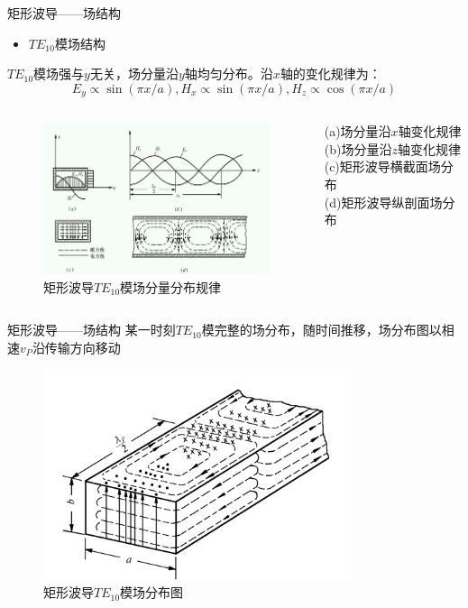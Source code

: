 \begin{frame}{矩形波导——场结构}
    \begin{itemize}
        \item $TE_{10}$模场结构
    \end{itemize}
    $TE_{10}$模场强与$y$无关，场分量沿$y$轴均匀分布。沿$x$轴的变化规律为：
    $$E_y \propto \sin(\pi x/a),H_x \propto \sin(\pi x/a),H_z \propto \cos(\pi x/a)$$
    \begin{columns}
        \begin{column}{0.7\linewidth}
            \begin{figure}
                \includegraphics[width=7cm]{Cha6//fig6-4.png}
                \caption{\footnotesize{矩形波导$TE_{10}$模场分量分布规律}}
            \end{figure}
        \end{column}
        \begin{column}{0.3\linewidth}
            {\footnotesize (a)场分量沿$x$轴变化规律\\
                (b)场分量沿$z$轴变化规律\\
                (c)矩形波导横截面场分布\\
                (d)矩形波导纵剖面场分布}
        \end{column}
    \end{columns}
\end{frame}

\begin{frame}{矩形波导——场结构}
    某一时刻$TE_{10}$模完整的场分布，随时间推移，场分布图以相速$v_P$沿传输方向移动
    \begin{figure}
        \includegraphics[width=9cm]{Cha6//fig6-5.png}
        \caption{\footnotesize{矩形波导$TE_{10}$模场分布图}}
    \end{figure}
\end{frame}

